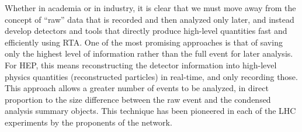 Whether in academia or in industry, it is clear that we must move away from the concept of ``raw'' data that is recorded and then analyzed only later, and instead develop detectors and tools that directly produce high-level quantities fast and efficiently using RTA.
One of the most promising approaches is that of saving only the highest level of information rather than the full event for later analysis. 
For HEP, this means reconstructing the detector information into high-level physics quantities (reconstructed particles) in real-time, and only recording those.
This approach allows a greater number of events to be analyzed, in direct proportion to the size difference between the raw event and the condensed analysis summary objects.
This technique has been pioneered in each of the LHC experiments by the proponents of the \acronym network. 

